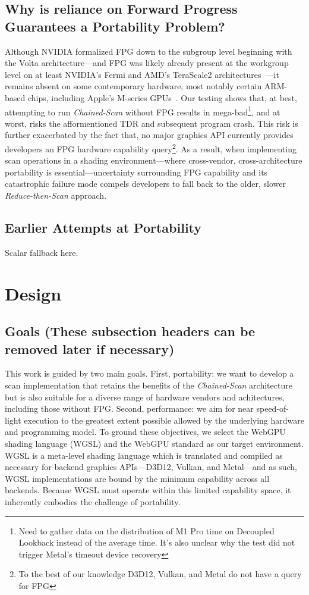 \documentclass[sigconf]{acmart}
\begin{document}
\subsection{Why is reliance on Forward Progress Guarantees a Portability Problem?}
Although NVIDIA formalized FPG down to the subgroup level beginning with the Volta architecture---and FPG was likely already present at the workgroup level on at least NVIDIA's Fermi and AMD's TeraScale2 architectures~\cite{}---it remains absent on some contemporary hardware, most notably certain ARM-based chips, including Apple's M-series GPUs~\cite{10.1145/3485508}. Our testing shows that, at best, attempting to run \emph{Chained-Scan} without FPG results in mega-bad\footnote{Need to gather data on the distribution of M1 Pro time on Decoupled Lookback instead of the average time. It's also unclear why the test did not trigger Metal's timeout device recovery}, and at worst, risks the afformentioned TDR and subsequent program crash. This risk is further exacerbated by the fact that, no major graphics API currently provides developers an FPG hardware capability query\footnote{To the best of our knowledge D3D12, Vulkan, and Metal do not have a query for FPG}. As a result, when implementing scan operations in a shading environment—where cross-vendor, cross-architecture portability is essential—uncertainty surrounding FPG capability and its catastrophic failure mode compels developers to fall back to the older, slower \emph{Reduce-then-Scan} approach.

\subsection{Earlier Attempts at Portability}
Scalar fallback here.

\section{Design}
\subsection{Goals (These subsection headers can be removed later if necessary)}
This work is guided by two main goals. First, portability: we want to develop a scan implementation that retains the benefits of the \emph{Chained-Scan} architecture but is also suitable for a diverse range of hardware vendors and achitectures, including those without FPG. Second, performance: we aim for near speed-of-light execution to the greatest extent possible allowed by the underlying hardware and programming model. To ground these objectives, we select the WebGPU shading language (WGSL) and the WebGPU standard as our target environment. WGSL is a meta-level shading language which is translated and compiled as necessary for backend graphics APIs---D3D12, Vulkan, and Metal---and as such, WGSL implementations are bound by the minimum capability across all backends. Because WGSL must operate within this limited capability space, it inherently embodies the challenge of portability.
\end{document}
